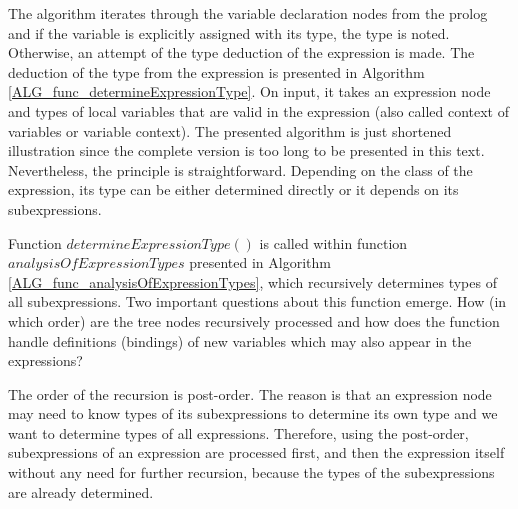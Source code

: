 The algorithm iterates through the variable declaration nodes from the prolog and if the variable is explicitly assigned with its type, the type is noted. Otherwise, an attempt of the type deduction of the expression is made. The deduction of the type from the expression is presented in Algorithm \ref{ALG_func_determineExpressionType}. On input, it takes an expression node and types of local variables that are valid in the expression (also called context of variables or variable context). The presented algorithm is just shortened illustration since the complete version is too long to be presented in this text. Nevertheless, the principle is straightforward. Depending on the class of the expression, its type can be either determined directly or it depends on its subexpressions. 

Function $determineExpressionType()$ is called within function $analysisOfExpressionTypes$ presented in Algorithm \ref{ALG_func_analysisOfExpressionTypes}, which recursively determines types of all subexpressions. Two important questions about this function emerge. How (in which order) are the tree nodes recursively processed and how does the function handle definitions (bindings) of new variables which may also appear in the expressions?

The order of the recursion is post-order. The reason is that an expression node may need to know types of its subexpressions to determine its own type and we want to determine types of all expressions. Therefore, using the post-order, subexpressions of an expression are processed first, and then the expression itself without any need for further recursion, because the types of the subexpressions are already determined.

